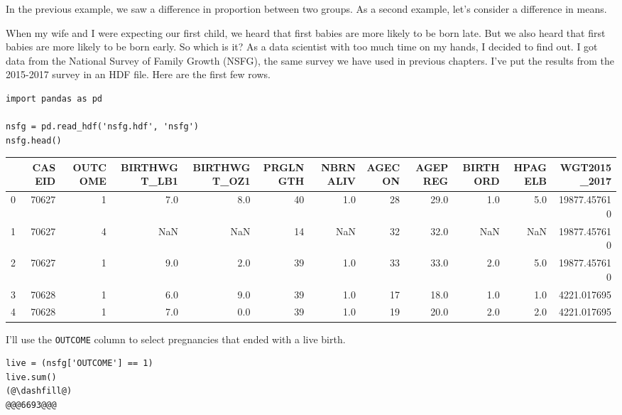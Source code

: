 In the previous example, we saw a difference in proportion between two
groups. As a second example, let's consider a difference in means.

When my wife and I were expecting our first child, we heard that first
babies are more likely to be born late. But we also heard that first
babies are more likely to be born early. So which is it? As a data
scientist with too much time on my hands, I decided to find out. I got
data from the National Survey of Family Growth (NSFG), the same survey
we have used in previous chapters. I've put the results from the
2015-2017 survey in an HDF file. Here are the first few rows.

\begin{lstlisting}[]
import pandas as pd

nsfg = pd.read_hdf('nsfg.hdf', 'nsfg')
nsfg.head()
\end{lstlisting}

\begin{tabular}{lrrrrrrrrrrr}
\midrule
{} &  CASEID &  OUTCOME &  BIRTHWGT\_LB1 &  BIRTHWGT\_OZ1 &  PRGLNGTH &  NBRNALIV &  AGECON &  AGEPREG &  BIRTHORD &  HPAGELB &  WGT2015\_2017 \\
\midrule
0 &   70627 &        1 &           7.0 &           8.0 &        40 &       1.0 &      28 &     29.0 &       1.0 &      5.0 &  19877.457610 \\
1 &   70627 &        4 &           NaN &           NaN &        14 &       NaN &      32 &     32.0 &       NaN &      NaN &  19877.457610 \\
2 &   70627 &        1 &           9.0 &           2.0 &        39 &       1.0 &      33 &     33.0 &       2.0 &      5.0 &  19877.457610 \\
3 &   70628 &        1 &           6.0 &           9.0 &        39 &       1.0 &      17 &     18.0 &       1.0 &      1.0 &   4221.017695 \\
4 &   70628 &        1 &           7.0 &           0.0 &        39 &       1.0 &      19 &     20.0 &       2.0 &      2.0 &   4221.017695 \\
\midrule
\end{tabular}

I'll use the \passthrough{\lstinline!OUTCOME!} column to select
pregnancies that ended with a live birth.

\begin{lstlisting}[]
live = (nsfg['OUTCOME'] == 1)
live.sum()
(@\dashfill@)
@@@6693@@@
\end{lstlisting}

